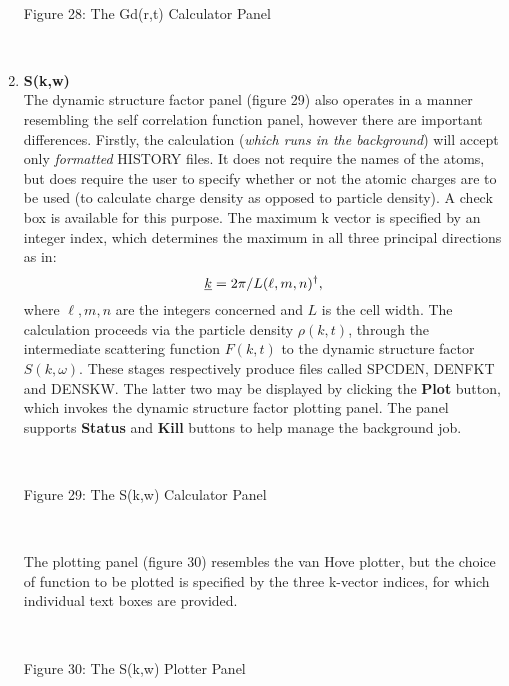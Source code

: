 \begin{enumerate}
~

\begin{center}
\centerline{}
\centerline{Figure 28: The Gd(r,t) Calculator Panel}
\end{center}

~

\item {\bf S(k,w)} \\
  The dynamic structure factor panel (figure 29) also operates in a manner
  resembling the self correlation function panel, however there are important
  differences. Firstly, the calculation ({\em which runs in the background})
  will accept only {\em formatted} HISTORY files. It does not require the
  names of the atoms, but does require the user to specify whether or not the
  atomic charges are to be used (to calculate charge density as opposed to
  particle density). A check box is available for this purpose. The maximum k
  vector is specified by an integer index, which determines the maximum in all
  three principal directions as in: \[\mbox{$\underline{k}$}=2\pi/L(\ell,m,n)^{\dagger},\]
  where $\ell,m,n$ are the integers concerned and $L$ is the cell width. The
  calculation proceeds via the particle density $\rho(k,t)$, through the
  intermediate scattering function $F(k,t)$ to the dynamic structure factor
  $S(k,\omega)$.  These stages respectively produce files called SPCDEN,
  DENFKT and DENSKW. The latter two may be displayed by clicking the {\bf
    Plot} button, which invokes the dynamic structure factor plotting panel.
  The panel supports {\bf Status} and {\bf Kill} buttons to help manage the
  background job.

~

\begin{center}
\centerline{}
\centerline{Figure 29: The S(k,w) Calculator Panel}
\end{center}

~

The plotting panel (figure 30) resembles the van Hove
plotter, but the choice of function to be plotted is specified
by the three k-vector indices, for which individual text boxes are
provided. 

~

\begin{center}
\centerline{}
\centerline{Figure 30: The S(k,w) Plotter Panel}
\end{center}

~

\end{enumerate}

